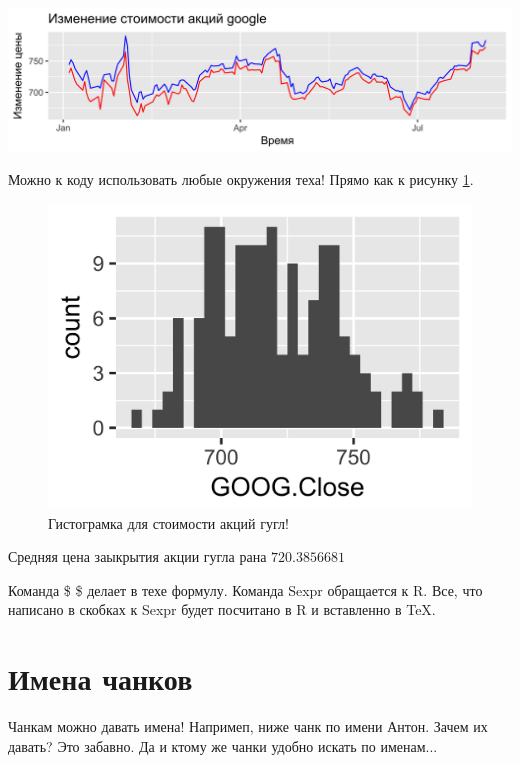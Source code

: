 \documentclass[12pt, a4paper]{article}\usepackage[]{graphicx}\usepackage[]{color}
\makeatletter
\def\maxwidth{ %
  \ifdim\Gin@nat@width>\linewidth
    \linewidth
  \else
    \Gin@nat@width
  \fi
}
\newenvironment{knitrout}{}{} %
\makeatother
\begin{document}
\begin{knitrout}
\color{fgcolor}

{\centering \includegraphics[width=\maxwidth]{figure/unnamed-chunk-7-1} 

}



\end{knitrout}

Можно к коду использовать любые окружения теха! Прямо как к рисунку \ref{fig}.

\begin{figure}[H]
\begin{knitrout}
\color{fgcolor}

{\centering \includegraphics[width=\maxwidth]{figure/unnamed-chunk-8-1} 

}



\end{knitrout}
\caption{Гистограмка для стоимости акций гугл! \label{fig}}
\end{figure}


Средняя цена заыкрытия акции гугла рана $720.3856681$

Команда \$ \$ делает в техе формулу. Команда Sexpr обращается к R. Все, что написано в скобках к Sexpr будет посчитано в R и вставленно в \TeX. 


\section{Имена чанков}

Чанкам можно давать имена! Напримеп, ниже чанк по имени Антон. Зачем их давать? Это забавно. Да и ктому же чанки удобно искать по именам...
\end{document}
